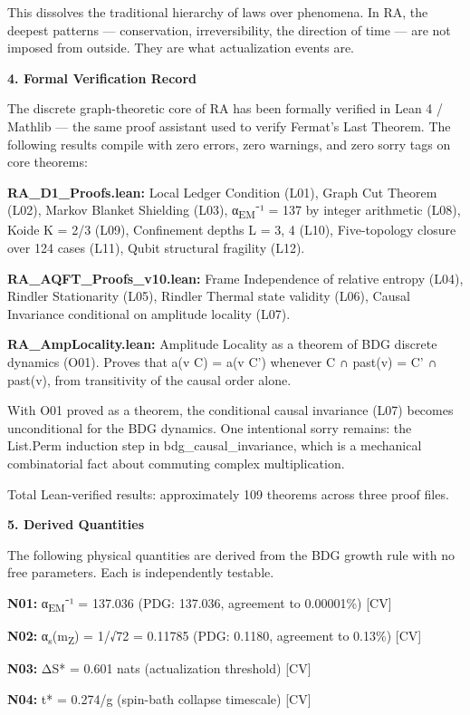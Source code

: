 \documentclass[12pt,a4paper]{article}
\begin{document}
This dissolves the traditional hierarchy of laws over phenomena. In RA,
the deepest patterns --- conservation, irreversibility, the direction of
time --- are not imposed from outside. They are what actualization
events are.

\textbf{4. Formal Verification Record}

The discrete graph-theoretic core of RA has been formally verified in
Lean 4 / Mathlib --- the same proof assistant used to verify Fermat's
Last Theorem. The following results compile with zero errors, zero
warnings, and zero sorry tags on core theorems:

\textbf{RA\_D1\_Proofs.lean:} Local Ledger Condition (L01), Graph Cut
Theorem (L02), Markov Blanket Shielding (L03), α\textsubscript{EM}⁻¹ =
137 by integer arithmetic (L08), Koide K = 2/3 (L09), Confinement depths
L = 3, 4 (L10), Five-topology closure over 124 cases (L11), Qubit
structural fragility (L12).

\textbf{RA\_AQFT\_Proofs\_v10.lean:} Frame Independence of relative
entropy (L04), Rindler Stationarity (L05), Rindler Thermal state
validity (L06), Causal Invariance conditional on amplitude locality
(L07).

\textbf{RA\_AmpLocality.lean:} Amplitude Locality as a theorem of BDG
discrete dynamics (O01). Proves that a(v \textbar{} C) = a(v \textbar{}
C') whenever C ∩ past(v) = C' ∩ past(v), from transitivity of the causal
order alone.

With O01 proved as a theorem, the conditional causal invariance (L07)
becomes unconditional for the BDG dynamics. One intentional sorry
remains: the List.Perm induction step in bdg\_causal\_invariance, which
is a mechanical combinatorial fact about commuting complex
multiplication.

Total Lean-verified results: approximately 109 theorems across three
proof files.

\textbf{5. Derived Quantities}

The following physical quantities are derived from the BDG growth rule
with no free parameters. Each is independently testable.

\textbf{N01:} α\textsubscript{EM}⁻¹ = 137.036 (PDG: 137.036, agreement
to 0.00001\%) {[}CV{]}

\textbf{N02:} α\textsubscript{s}(m\textsubscript{Z}) = 1/√72 = 0.11785
(PDG: 0.1180, agreement to 0.13\%) {[}CV{]}

\textbf{N03:} ΔS* = 0.601 nats (actualization threshold) {[}CV{]}

\textbf{N04:} t* = 0.274/g (spin-bath collapse timescale) {[}CV{]}
\end{document}

